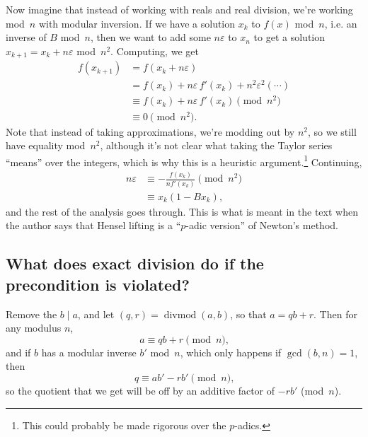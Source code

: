\documentclass{computer-arithmetic}
\begin{document}
Now imagine that instead of working with reals and real division,
we're working mod~\(n\) with modular inversion. If we have a solution
\(x_k\) to \(f(x)\) mod~\(n\), i.e. an inverse of \(B\) mod~\(n\),
then we want to add some \(nε\) to \(x_n\) to get a
solution \(x_{k+1} = x_k + nε\) mod~\(n^2\). Computing, we get
\begin{align*}
  f(x_{k+1}) &= f(x_k + nε) \\
             &= f(x_k) + nε \, f'(x_k) + n^2ε^2(⋯) \\
             &≡ f(x_k) + nε \, f'(x_k) \pmod{n^2} \\
             &≡ 0 \pmod{n^2} \text{.}
\end{align*}
Note that instead of taking approximations, we're modding out by
\(n^2\), so we still have equality mod~\(n^2\), although it's not
clear what taking the Taylor series ``means'' over the integers, which
is why this is a heuristic argument.\footnote{This could probably be
  made rigorous over the \(p\)-adics.} Continuing,
\begin{align*}
  nε &≡ -\frac{f(x_k)}{n f'(x_k)} \pmod{n^2} \\
    &≡ x_k(1 - B x_k)\text{,}
\end{align*}
and the rest of the analysis goes through. This is what is meant in
the text when the author says that Hensel lifting is a ``\(p\)-adic
version'' of Newton's method.

\subsection{What does exact division do if the precondition is violated?}

Remove the \(b \mid a\), and let
\((q, r) = \operatorname{divmod}(a, b)\), so that \(a = qb + r\). Then
for any modulus \(n\),
\[
  a ≡ qb + r \pmod n\text{,}
\]
and if \(b\) has a modular inverse \(b'\) mod~\(n\), which only
happens if \(\gcd(b, n) = 1\), then
\[
  q ≡ ab' - rb' \pmod n\text{,}
\]
so the quotient that we get will be off by an additive factor of
\(-rb'\) (mod~\(n\)).
\end{document}
